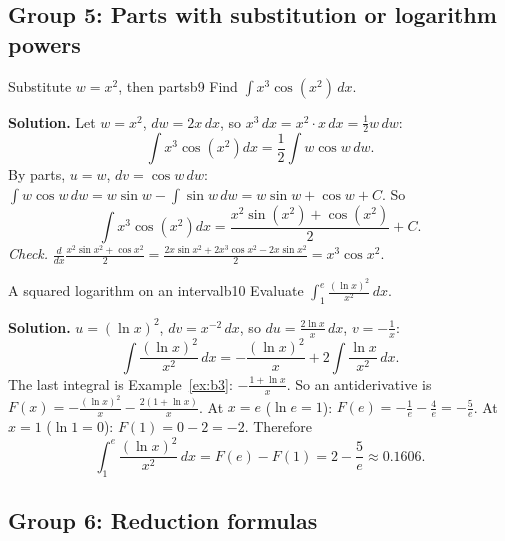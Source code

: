 \documentclass[11pt]{article}
\begin{document}
\subsection*{Group 5: Parts with substitution or logarithm powers}

\begin{exmp}{Substitute $w=x^2$, then parts}{b9}
Find $\int x^3\cos\left(x^2\right)\,dx$.

\textbf{Solution.} Let $w=x^2$, $dw=2x\,dx$, so $x^3\,dx=x^2\cdot x\,dx=\frac12w\,dw$:
\[\int x^3\cos\left(x^2\right)dx=\frac12\int w\cos w\,dw .\]
By parts, $u=w$, $dv=\cos w\,dw$: $\int w\cos w\,dw=w\sin w-\int\sin w\,dw=w\sin w+\cos w+C$. So
\[\int x^3\cos\left(x^2\right)dx=\frac{x^2\sin\left(x^2\right)+\cos\left(x^2\right)}2+C .\]
\emph{Check.} $\frac{d}{dx}\frac{x^2\sin x^2+\cos x^2}2=\frac{2x\sin x^2+2x^3\cos x^2-2x\sin x^2}2=x^3\cos x^2$.
\end{exmp}

\begin{exmp}{A squared logarithm on an interval}{b10}
Evaluate $\int_1^e\frac{(\ln x)^2}{x^2}\,dx$.

\textbf{Solution.} $u=(\ln x)^2$, $dv=x^{-2}\,dx$, so $du=\frac{2\ln x}x\,dx$, $v=-\frac1x$:
\[\int\frac{(\ln x)^2}{x^2}\,dx=-\frac{(\ln x)^2}x+2\int\frac{\ln x}{x^2}\,dx .\]
The last integral is Example~\ref{ex:b3}: $-\frac{1+\ln x}x$. So an antiderivative is $F(x)=-\frac{(\ln x)^2}x-\frac{2(1+\ln x)}x$. At $x=e$ ($\ln e=1$): $F(e)=-\frac1e-\frac4e=-\frac5e$. At $x=1$ ($\ln1=0$): $F(1)=0-2=-2$. Therefore
\[\int_1^e\frac{(\ln x)^2}{x^2}\,dx=F(e)-F(1)=2-\frac5e\approx0.1606 .\]
\end{exmp}

\subsection*{Group 6: Reduction formulas}
\end{document}
